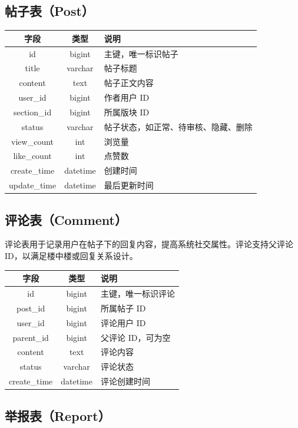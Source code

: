 \documentclass[UTF8,a4paper,12pt]{ctexart}
\begin{document}
\subsection{帖子表（Post）}

\begin{longtable}{|c|c|p{7cm}|}
\hline
字段 & 类型 & 说明 \\
\hline
id & bigint & 主键，唯一标识帖子 \\
title & varchar & 帖子标题 \\
content & text & 帖子正文内容 \\
user\_id & bigint & 作者用户 ID \\
section\_id & bigint & 所属版块 ID \\
status & varchar & 帖子状态，如正常、待审核、隐藏、删除 \\
view\_count & int & 浏览量 \\
like\_count & int & 点赞数 \\
create\_time & datetime & 创建时间 \\
update\_time & datetime & 最后更新时间 \\
\hline
\end{longtable}

\subsection{评论表（Comment）}

评论表用于记录用户在帖子下的回复内容，提高系统社交属性。评论支持父评论 ID，以满足楼中楼或回复关系设计。

\begin{longtable}{|c|c|p{7cm}|}
\hline
字段 & 类型 & 说明 \\
\hline
id & bigint & 主键，唯一标识评论 \\
post\_id & bigint & 所属帖子 ID \\
user\_id & bigint & 评论用户 ID \\
parent\_id & bigint & 父评论 ID，可为空 \\
content & text & 评论内容 \\
status & varchar & 评论状态 \\
create\_time & datetime & 评论创建时间 \\
\hline
\end{longtable}

\subsection{举报表（Report）}
\end{document}
